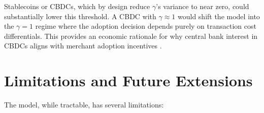 \documentclass{article}
\begin{document}
Stablecoins or CBDCs, which by design reduce $\gamma$'s variance to near zero,
could substantially lower this threshold.
A CBDC with $\gamma \approx 1$ would shift the model into the $\gamma = 1$
regime where the adoption decision depends purely on transaction cost
differentials.
This provides an economic rationale for why central bank interest in CBDCs
aligns with merchant adoption incentives \citep{bis2023,bordo2017}.

\section{Limitations and Future Extensions}
\label{sec:limitations}

The model, while tractable, has several limitations:
\end{document}
